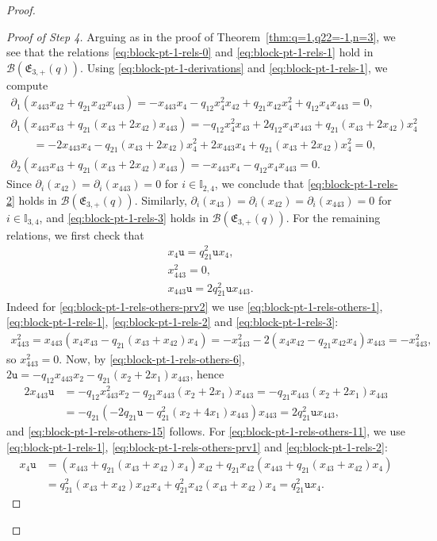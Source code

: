 \documentclass[10pt,a4paper]{amsart}
\numberwithin{equation}{section}
\newcommand{\toba}{\mathscr B}
\newcommand{\I}{{\mathbb I}}
\newcommand{\ut}{\mathtt{u}}
\newcommand{\eny}{\mathfrak{E}}
\begin{document}
\begin{proof}
\begin{proof}[Proof of Step 4]
Arguing as in the proof of Theorem~\ref{thm:q=1,q22=-1,n=3},
we see that the relations \eqref{eq:block-pt-1-rels-0} and \eqref{eq:block-pt-1-rels-1} hold in $\toba(\eny_{3,+}(q))$.
Using \eqref{eq:block-pt-1-derivations} and \eqref{eq:block-pt-1-rels-1}, we compute
\begin{gather*}
\partial_1 (x_{443}x_{42}+q_{21}x_{42}x_{443}) = -x_{443}x_{4} -q_{12} x_{4}^2 x_{42} + q_{21}x_{42}x_{4}^2 + q_{12}x_{4}x_{443}=0,
\\
\partial_1 (x_{443}x_{43}+q_{21}(x_{43}+2x_{42})x_{443}) =
-q_{12} x_{4}^2x_{43} + 2q_{12}x_{4}x_{443}
 + q_{21}(x_{43}+2x_{42})x_{4}^2
\\ \qquad
{}= -2x_{443}x_{4} -q_{21}(x_{43}+2x_{42})x_4^2
+ 2x_{443}x_{4}+ q_{21}(x_{43}+2x_{42})x_{4}^2 =0,
\\
\partial_2 (x_{443}x_{43}+q_{21}(x_{43}+2x_{42})x_{443}) = -x_{443}x_{4}-q_{12}x_{4}x_{443}=0.
\end{gather*}
Since $\partial_i(x_{42})=\partial_i(x_{443})=0$ for $i\in\I_{2,4}$, we conclude that \eqref{eq:block-pt-1-rels-2} holds in $\toba(\eny_{3,+}(q))$.
Similarly, $\partial_i(x_{43})=\partial_i(x_{42})=\partial_i(x_{443})=0$ for $i\in\I_{3,4}$, and \eqref{eq:block-pt-1-rels-3} holds
in $\toba(\eny_{3,+}(q))$.
For the remaining relations, we first check that
\begin{align}
\label{eq:block-pt-1-rels-others-11}
& x_4 \ut=q_{21}^2\ut x_4,
\\ \label{eq:block-pt-1-rels-others-prv2}
& x_{443}^2=0,
\\ \label{eq:block-pt-1-rels-others-15}
& x_{443}\ut = 2q_{21}^2\ut x_{443}.
\end{align}
Indeed for \eqref{eq:block-pt-1-rels-others-prv2} we use \eqref{eq:block-pt-1-rels-others-1}, \eqref{eq:block-pt-1-rels-1}, \eqref{eq:block-pt-1-rels-2} and \eqref{eq:block-pt-1-rels-3}:
\begin{align*}
x_{443}^2 = x_{443}(x_4x_{43}-q_{21}(x_{43}+x_{42})x_4)
=-x_{443}^2-2(x_{4}x_{42}-q_{21}x_{42}x_4)x_{443}=-x_{443}^2,
\end{align*}
so $x_{443}^2 = 0$. Now, by \eqref{eq:block-pt-1-rels-others-6},
$2\ut=-q_{12}x_{443}x_2-q_{21}(x_2+2x_1)x_{443}$, hence
\begin{align*}
2x_{443}\ut &= -q_{12}x_{443}^2x_2-q_{21}x_{443}(x_2+2x_1)x_{443}=-q_{21}x_{443}(x_2+2x_1)x_{443}
\\
& = -q_{21}(-2q_{21}\ut -q_{21}^2(x_2+4x_1)x_{443})x_{443} =2q_{21}^2\ut x_{443},
\end{align*}
and \eqref{eq:block-pt-1-rels-others-15} follows.
For \eqref{eq:block-pt-1-rels-others-11}, we use \eqref{eq:block-pt-1-rels-1}, \eqref{eq:block-pt-1-rels-others-prv1} and \eqref{eq:block-pt-1-rels-2}:
\begin{align*}
x_4\ut &= (x_{443}+q_{21}(x_{43}+x_{42})x_4)x_{42}+q_{21}x_{42}(x_{443}+q_{21}(x_{43}+x_{42})x_4)
\\
&= q_{21}^2(x_{43}+x_{42})x_{42}x_4+q_{21}^2x_{42}(x_{43}+x_{42})x_4 = q_{21}^2 \ut x_4.
\end{align*}



\end{proof}
\end{proof}
\end{document}
